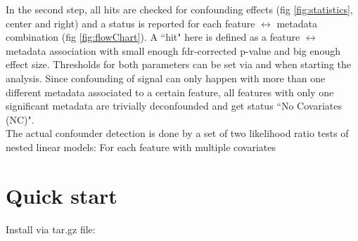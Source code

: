 \documentclass{article}\usepackage[]{graphicx}\usepackage[usenames,dvipsnames]{color}
\begin{document}
In the second step, all hits are checked for confounding effects (fig \ref{fig:statistics}, center and right) and a status is reported for each feature $\leftrightarrow$  metadata combination (fig \ref{fig:flowChart}). A ``hit" here is defined as a feature $\leftrightarrow$ metadata association with small enough fdr-corrected p-value and big enough  effect size. Thresholds for both parameters can be set via  and  when starting the analysis. Since confounding of signal can only happen with more than one different metadata associated to a certain feature, all features with only one significant metadata are trivially deconfounded and get status ``No Covariates (NC)". \\
The actual confounder detection is done by a set of two likelihood ratio tests of nested linear models: For each feature with multiple covariates
 
 

\section{Quick start}

Install via tar.gz file: 

\RequirePackage[]{/home/till/R/x86_64-pc-linux-gnu-library/3.6/BiocStyle/resources/tex/Bioconductor}
\AtBeginDocument{}

%
%
%


%
\end{document}
